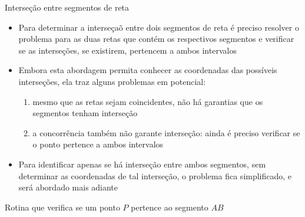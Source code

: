 \begin{frame}[fragile]{Interseção entre segmentos de reta}

    \begin{itemize}
        \item Para determinar a interseçaõ entre dois segmentos de reta é preciso resolver o 
            problema para as duas retas que contém os respectivos segmentos e verificar se as interseções, se existirem, pertencem a ambos intervalos

        \item Embora esta abordagem permita conhecer as coordenadas das possíveis interseções, ela              traz alguns problemas em potencial:

        \begin{enumerate}
            \item mesmo que as retas sejam coincidentes, não há garantias que os segmentos 
                tenham interseção

            \item a concorrência também não garante interseção: ainda é preciso verificar se o ponto pertence a ambos intervalos
        \end{enumerate}

        \item Para identificar apenas se há interseção entre ambos segmentos, sem determinar 
            as coordenadas de tal interseção, o problema fica simplificado, e será abordado
            mais adiante
    \end{itemize}

\end{frame}

\begin{frame}[fragile]{Rotina que verifica se um ponto $P$ pertence ao segmento $AB$}
\end{frame}
